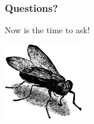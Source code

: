 \documentclass{beamer}
\begin{document}
\begin{frame}
  \frametitle{Questions?}

\begin{center}
  Now is the time to ask!
  \vfill

  \includegraphics[height=9em]{fly.png}
\end{center}
\end{frame}
\end{document}
